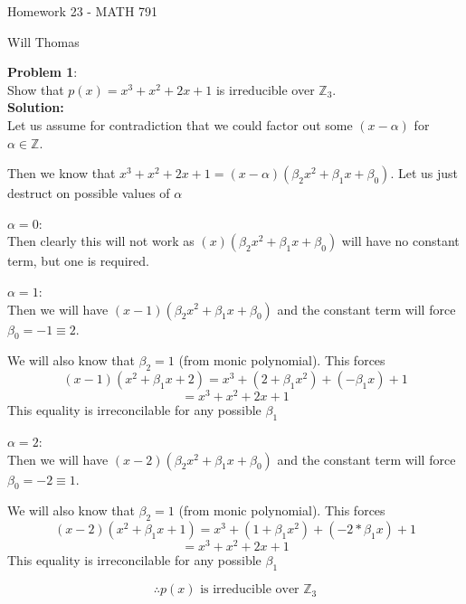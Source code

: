 \documentclass[11pt]{article}
\newcommand{\prob}[3]{\begin{flushleft}
        \textbf{Problem #1}: \\
        #2 
		\textbf{Solution:} 
		#3

\end{flushleft}}
\newcommand{\makeHWtitle}[1]{
    \begin{center}
    \Large{Homework #1 - MATH 791} 
        \vspace{5pt}
        
        \normalsize{Will Thomas}
        \vspace{5pt}
    \end{center}
}
\begin{document}
\makeHWtitle{23}

\prob{1}{
  Show that $p(x) = x^3 + x^2 + 2x + 1$ is irreducible over $\mathbb{Z}_3$. \\
}{ \\
  Let us assume for contradiction that we could factor out some $(x - \alpha)$ for $\alpha \in \mathbb{Z}$.

  Then we know that $x^3 + x^2 + 2x + 1 = (x - \alpha)(\beta_2 x^2 + \beta_1 x + \beta_0)$.
  Let us just destruct on possible values of $\alpha$

  \textbf{$\alpha = 0$}: \\
  Then clearly this will not work as $(x)(\beta_2 x^2 + \beta_1 x + \beta_0)$ will have no constant term, but one is required.

  \textbf{$\alpha = 1$}: \\
  Then we will have $(x - 1)(\beta_2 x^2 + \beta_1 x + \beta_0)$
  and the constant term will force $\beta_0 = -1 \equiv 2$.

  We will also know that $\beta_2 = 1$ (from monic polynomial).
  This forces
  $$(x - 1)(x^2 + \beta_1 x + 2) = x^3 + (2 + \beta_1 x^2) + (-\beta_1 x) + 1$$
  $$= x^3 + x^2 + 2x + 1$$
  This equality is irreconcilable for any possible $\beta_1$

  \textbf{$\alpha = 2$}: \\
  Then we will have $(x - 2)(\beta_2 x^2 + \beta_1 x + \beta_0)$
  and the constant term will force $\beta_0 = -2 \equiv 1$.


  We will also know that $\beta_2 = 1$ (from monic polynomial).
  This forces
  $$(x - 2)(x^2 + \beta_1 x + 1) = x^3 + (1 + \beta_1 x^2) + (-2*\beta_1 x) + 1$$
  $$= x^3 + x^2 + 2x + 1$$
  This equality is irreconcilable for any possible $\beta_1$

  $$\therefore \text{$p(x)$ is irreducible over $\mathbb{Z}_3$}$$
}
\end{document}
